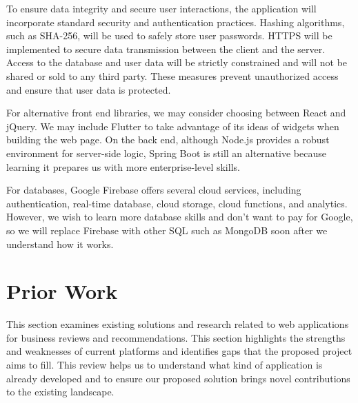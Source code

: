 \documentclass[10pt,twocolumn]{article}
\begin{document}
To ensure data integrity and secure user interactions, the application will incorporate standard security and authentication practices. Hashing algorithms, such as SHA-256, will be used to safely store user passwords. HTTPS will be implemented to secure data transmission between the client and the server. Access to the database and user data will be strictly constrained and will not be shared or sold to any third party. These measures prevent unauthorized access and ensure that user data is protected.

For alternative front end libraries, we may consider choosing between React and jQuery. We may include Flutter to take advantage of its ideas of widgets when building the web page. On the back end, although Node.js provides a robust environment for server-side logic, Spring Boot is still an alternative because learning it prepares us with more enterprise-level skills.

For databases, Google Firebase offers several cloud services, including authentication, real-time database, cloud storage, cloud functions, and analytics. However, we wish to learn more database skills and don’t want to pay for Google, so we will replace Firebase with other SQL such as MongoDB soon after we understand how it works. 

\section{Prior Work}
This section examines existing solutions and research related to web applications for business reviews and recommendations. This section highlights the strengths and weaknesses of current platforms and identifies gaps that the proposed project aims to fill. This review helps us to understand what kind of application is already developed and to ensure our proposed solution brings novel contributions to the existing landscape.
\end{document}
